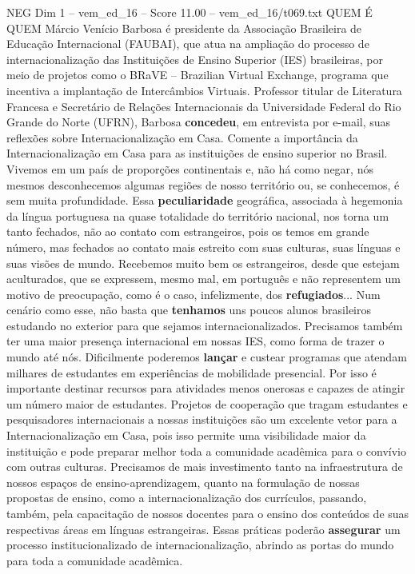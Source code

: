 \begin{textsample}{NEG Dim 1 – vem\_ed\_16 – Score 11.00 – vem\_ed\_16/t069.txt}  \label{ex:f1_neg_100}
QUEM É QUEM Márcio Venício Barbosa é presidente da Associação Brasileira de Educação Internacional (FAUBAI), que atua na ampliação do processo de internacionalização das Instituições de Ensino Superior (IES) brasileiras, por meio de projetos como o BRaVE – Brazilian Virtual Exchange, programa que incentiva a implantação de Intercâmbios Virtuais.
Professor titular de Literatura Francesa e Secretário de Relações Internacionais da Universidade Federal do Rio Grande do Norte (UFRN), Barbosa \textbf{concedeu}, em entrevista por e-mail, suas reflexões sobre Internacionalização em Casa.
Comente a importância da Internacionalização em Casa para as instituições de ensino superior no Brasil.
Vivemos em um país de proporções continentais e, não há como negar, nós mesmos desconhecemos algumas regiões de nosso território ou, se conhecemos, é sem muita profundidade.
Essa \textbf{peculiaridade} geográfica, associada à hegemonia da língua portuguesa na quase totalidade do território nacional, nos torna um tanto fechados, não ao contato com estrangeiros, pois os temos em grande número, mas fechados ao contato mais estreito com suas culturas, suas línguas e suas visões de mundo.
Recebemos muito bem os estrangeiros, desde que estejam aculturados, que se expressem, mesmo mal, em português e não representem um motivo de preocupação, como é o caso, infelizmente, dos \textbf{refugiados}...
Num cenário como esse, não basta que \textbf{tenhamos} uns poucos alunos brasileiros estudando no exterior para que sejamos internacionalizados.
Precisamos também ter uma maior presença internacional em nossas IES, como forma de trazer o mundo até nós.
Dificilmente poderemos \textbf{lançar} e custear programas que atendam milhares de estudantes em experiências de mobilidade presencial.
Por isso é importante destinar recursos para atividades menos onerosas e capazes de atingir um número maior de estudantes.
Projetos de cooperação que tragam estudantes e pesquisadores internacionais a nossas instituições são um excelente vetor para a Internacionalização em Casa, pois isso permite uma visibilidade maior da instituição e pode preparar melhor toda a comunidade acadêmica para o convívio com outras culturas.
Precisamos de mais investimento tanto na infraestrutura de nossos espaços de ensino-aprendizagem, quanto na formulação de nossas propostas de ensino, como a internacionalização dos currículos, passando, também, pela capacitação de nossos docentes para o ensino dos conteúdos de suas respectivas áreas em línguas estrangeiras.
Essas práticas poderão \textbf{assegurar} um processo institucionalizado de internacionalização, abrindo as portas do mundo para toda a comunidade acadêmica.

\end{textsample}
